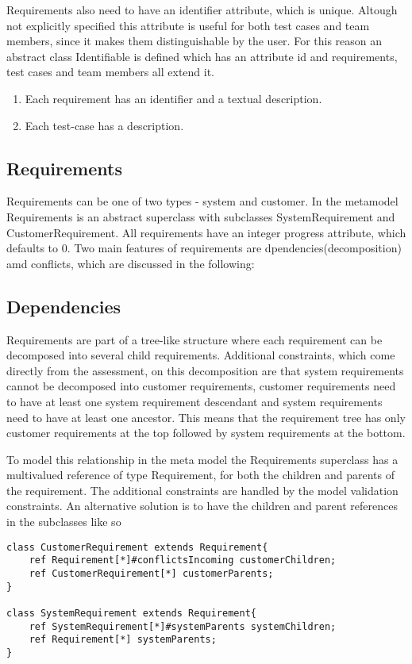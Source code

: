 \documentclass[11pt,a4paper]{scrartcl}
\begin{document}
	Requirements also need to have an identifier attribute, which is unique. Altough not explicitly specified this attribute is useful for both test cases and team members, since it makes them distinguishable by the user. For this reason an abstract class Identifiable is defined which has an attribute id and requirements, test cases and team members all extend it.
	
	\begin{enumerate}
		\item Each requirement has an identifier and a textual description.
		\item Each test-case has a description.
	\end{enumerate}
	


	\subsection{Requirements}
	Requirements can be one of two types - system and customer. In the metamodel Requirements is an abstract superclass with subclasses SystemRequirement and CustomerRequirement. All requirements have an integer progress attribute, which defaults to 0. Two main features of requirements are dpendencies(decomposition) amd conflicts, which are discussed in the following: 
	
	\subsection{Dependencies}
	Requirements are part of a tree-like structure where each requirement can be decomposed into several child requirements. Additional constraints, which come directly from the assessment, on this decomposition are that system requirements cannot be decomposed into customer requirements, customer requirements need to have at least one system requirement descendant and system requirements need to have at least one ancestor. This means that the requirement tree has only customer requirements at the top followed by system requirements at the bottom.
	
	To model this relationship in the meta model the Requirements superclass has a multivalued reference of type Requirement, for both the children and parents of the requirement. The additional constraints are handled by the model validation constraints. An alternative solution is to have the children and parent references in the subclasses like so
	
	\begin{lstlisting}
class CustomerRequirement extends Requirement{
	ref Requirement[*]#conflictsIncoming customerChildren;
	ref CustomerRequirement[*] customerParents;
}

class SystemRequirement extends Requirement{
	ref SystemRequirement[*]#systemParents systemChildren;
	ref Requirement[*] systemParents;
}
	\end{lstlisting}
	
\end{document}
